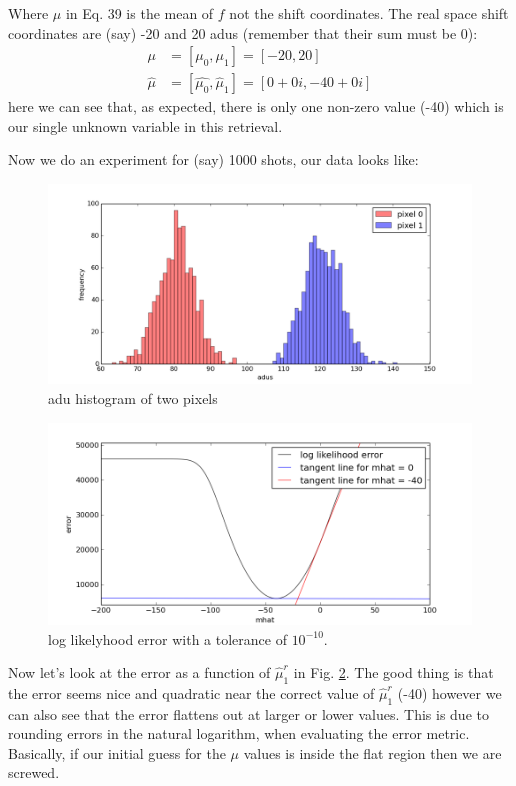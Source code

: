 \documentclass[11pt]{article}
\begin{document}
Where $\mu$ in Eq. 39 is the mean of $f$ not the shift coordinates. The real space shift coordinates are (say) -20 and 20 adus (remember that their sum must be 0):
\begin{align}
   \mu       &= [\mu_0, \mu_1] = [-20, 20] \\
   \hat{\mu} &= [\hat{\mu_0}, \hat{\mu}_1] = [0 + 0i, -40 + 0i]
\end{align}
here we can see that, as expected, there is only one non-zero value (-40) which is our single unknown variable in this retrieval.

Now we do an experiment for (say) 1000 shots, our data looks like:
\begin{figure}[htp]
\centering
\includegraphics[scale=0.50]{figure_1.png}
\caption{adu histogram of two pixels}
\label{data}
\end{figure}

\begin{figure}[htp]
\centering
\includegraphics[scale=0.50]{figure_3.png}
\caption{log likelyhood error with a tolerance of $10^{-10}$.}
\label{error}
\end{figure}
Now let's look at the error as a function of $\hat{\mu}_1^r$ in Fig. \ref{error}. The good thing is that the error seems nice and quadratic near the correct value of $\hat{\mu}_1^r$ (-40) however we can also see that the error flattens out at larger or lower values. This is due to rounding errors in the natural logarithm, when evaluating the error metric. Basically, if our initial guess for the $\mu$ values is inside the flat region then we are screwed.
\end{document}
